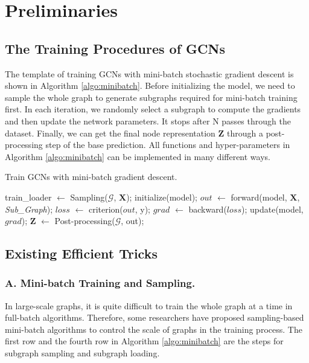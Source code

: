 \documentclass[runningheads]{llncs}
\begin{document}
\section{Preliminaries}\label{preliminaries}

\subsection{The Training Procedures of
GCNs}

The template of training GCNs with mini-batch
stochastic gradient descent is shown in Algorithm \ref{algo:minibatch}. Before initializing the model, we need to sample the whole graph to generate subgraphs required for mini-batch training first. In each iteration, we randomly select a subgraph to compute the gradients and then update the network parameters. It stops after N passes through the dataset. Finally, we can get the final node representation $\bm{Z}$ through a post-processing step 
of the base prediction. All functions
and hyper-parameters in Algorithm \ref{algo:minibatch} can be implemented
in many different ways. 


\begin{algorithm}[h]
\caption{Train GCNs with mini-batch gradient descent.}
\label{algo:minibatch}
\begin{algorithmic}[1]
\STATE train\_loader $\leftarrow$ Sampling($\mathcal{G}$, $\bm{X}$);
\STATE initialize(model);
        \STATE $out$ $\leftarrow$ forward(model, $\bm{X}$, \emph{Sub\_Graph});
        \STATE $loss$ $\leftarrow$ criterion($out$, y);
        \STATE $grad$ $\leftarrow$ backward($loss$);
        \STATE update(model, $grad$);
    \ENDFOR
\ENDFOR
\STATE $\bm{Z}$ $\leftarrow$ Post-processing($\mathcal{G}$, out);
\end{algorithmic}
\end{algorithm}

\subsection{Existing Efficient
Tricks}

\subsubsection{A. Mini-batch Training and
Sampling.} 
In large-scale graphs, it is quite difficult to train the whole graph
at a time in full-batch algorithms. Therefore, some researchers have
proposed sampling-based mini-batch algorithms to control the scale of graphs in the training process. The first
row and the fourth row in Algorithm \ref{algo:minibatch} are the steps for subgraph
sampling and subgraph loading.
\end{document}
